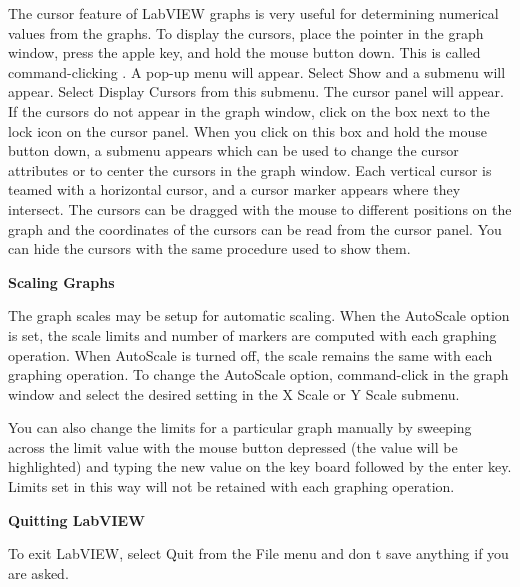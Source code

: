 The cursor feature of LabVIEW graphs is very useful for determining
numerical values from the graphs. To display the cursors, place the
pointer in the graph window, press the apple key, and hold the mouse
button down. This is called command-clicking . A pop-up menu will
appear. Select Show and a submenu will appear. Select Display Cursors
from this submenu. The cursor panel will appear. If the cursors do
not appear in the graph window, click on the box next to the lock
icon on the cursor panel. When you click on this box and hold the
mouse button down, a submenu appears which can be used to change the
cursor attributes or to center the cursors in the graph window. Each
vertical cursor is teamed with a horizontal cursor, and a cursor marker
appears where they intersect. The cursors can be dragged with the
mouse to different positions on the graph and the coordinates of the
cursors can be read from the cursor panel. You can hide the cursors
with the same procedure used to show them.

\textbf{Scaling Graphs} 

The graph scales may be setup for automatic scaling. When the AutoScale
option is set, the scale limits and number of markers are computed
with each graphing operation. When AutoScale is turned off, the scale
remains the same with each graphing operation. To change the AutoScale
option, command-click in the graph window and select the desired setting
in the X Scale or Y Scale submenu.

You can also change the limits for a particular graph manually by
sweeping across the limit value with the mouse button depressed (the
value will be highlighted) and typing the new value on the key board
followed by the enter key. Limits set in this way will not be retained
with each graphing operation.

\textbf{Quitting LabVIEW} 

To exit LabVIEW, select Quit from the File menu and don t save anything
if you are asked.
